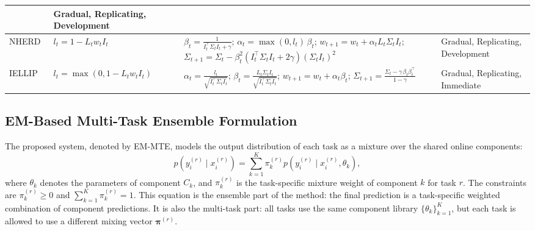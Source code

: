 \documentclass[12pt,a4paper]{article}
\begin{document}
\begin{table}[H]
{\begin{tabular}{|l|l|l|l|}
				& Gradual, Replicating, Development \\
				\hline
				NHERD~\cite{Crammer2010}
				& $l_t = 1 - L_t w_t I_t$
				& $\beta_t = \frac{1}{I_t^{\top}\Sigma_t I_t + \gamma}$;\; $\alpha_t = \max(0, l_t)\,\beta_t$;\; $w_{t+1} = w_t + \alpha_t L_t \Sigma_t I_t$;\; $\Sigma_{t+1} = \Sigma_t - \beta_t^2(I_t^{\top}\Sigma_t I_t + 2\gamma)(\Sigma_t I_t)^2$
				& Gradual, Replicating, Development \\
				\hline
				IELLIP~\cite{Yang2009}
				& $l_t = \max(0, 1 - L_t w_t I_t)$
				& $\alpha_t = \frac{l_t}{\sqrt{I_t^{\top}\Sigma_t I_t}}$;\; $\beta_t = \frac{L_t \Sigma_t I_t}{\sqrt{I_t^{\top}\Sigma_t I_t}}$;\; $w_{t+1} = w_t + \alpha_t \beta_t$;\; $\Sigma_{t+1} = \frac{\Sigma_t - \gamma\,\beta_t\beta_t^{\top}}{1-\gamma}$
				& Gradual, Replicating, Immediate \\
				\hline
			\end{tabular}%
		}
	\end{table}
	
	\subsection{EM-Based Multi-Task Ensemble Formulation}
	
	The proposed system, denoted by EM-MTE, models the output distribution of each task as a mixture over the shared online components:
	\begin{equation}
		p\!\left(y_i^{(r)} \mid x_i^{(r)}\right)
		=
		\sum_{k=1}^{K} \pi_k^{(r)}
		p\!\left(y_i^{(r)} \mid x_i^{(r)},\theta_k\right),
		\label{eq:em_mte_mixture}
	\end{equation}
	where $\theta_k$ denotes the parameters of component $C_k$, and $\pi_k^{(r)}$ is the task-specific mixture weight of component $k$ for task $r$. The constraints are $\pi_k^{(r)} \geq 0$ and $\sum_{k=1}^{K}\pi_k^{(r)}=1$. This equation is the ensemble part of the method: the final prediction is a task-specific weighted combination of component predictions. It is also the multi-task part: all tasks use the same component library $\{\theta_k\}_{k=1}^K$, but each task is allowed to use a different mixing vector $\boldsymbol{\pi}^{(r)}$.
	
\end{document}
